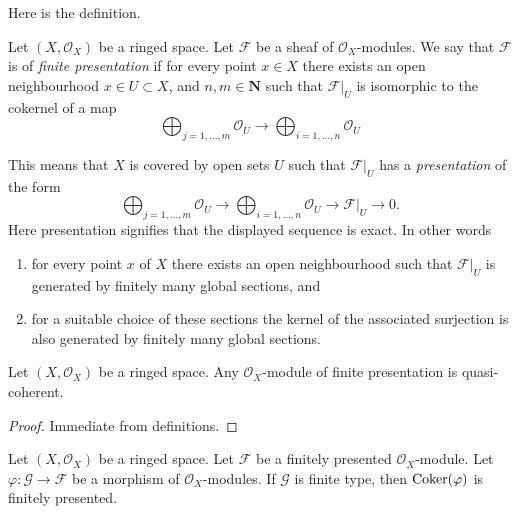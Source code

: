 \noindent
Here is the definition.

\begin{definition}
\label{definition-finite-presentation}
\begin{reference}
\cite[Chapter II, \S 2, no. 38, p. 231]{FAC}
\end{reference}
Let $(X, \mathcal{O}_X)$ be a ringed space.
Let $\mathcal{F}$ be a sheaf of $\mathcal{O}_X$-modules.
We say that $\mathcal{F}$ is of {\it finite presentation}
if for every point $x \in X$ there exists an open neighbourhood
$x\in U \subset X$, and  $n, m \in \mathbf{N}$ such that $\mathcal{F}|_U$
is isomorphic to the cokernel of a map
$$
\bigoplus\nolimits_{j = 1, \ldots, m}
\mathcal{O}_U
\longrightarrow
\bigoplus\nolimits_{i = 1, \ldots, n}
\mathcal{O}_U
$$
\end{definition}

\noindent
This means that $X$ is covered by open sets $U$
such that $\mathcal{F}|_U$ has a {\it presentation}
of the form
$$
\bigoplus\nolimits_{j = 1, \ldots, m}
\mathcal{O}_U
\longrightarrow
\bigoplus\nolimits_{i = 1, \ldots, n}
\mathcal{O}_U
\to
\mathcal{F}|_U
\to
0.
$$
Here presentation signifies that the displayed
sequence is exact. In other words
\begin{enumerate}
\item for every point $x$ of $X$ there exists
an open neighbourhood such that $\mathcal{F}|_U$
is generated by finitely many global sections, and
\item for a suitable choice of these sections
the kernel of the associated surjection is also
generated by finitely many global sections.
\end{enumerate}

\begin{lemma}
\label{lemma-finite-presentation-quasi-coherent}
Let $(X, \mathcal{O}_X)$ be a ringed space.
Any $\mathcal{O}_X$-module of finite presentation
is quasi-coherent.
\end{lemma}

\begin{proof}
Immediate from definitions.
\end{proof}

\begin{lemma}
\label{lemma-cokernel-finite-finite-presentation}
Let $(X,\mathcal{O}_X)$ be a ringed space. Let $\mathcal{F}$ be a
finitely presented $\mathcal{O}_X$-module. Let
$\varphi : \mathcal{G} \to \mathcal{F}$ be a morphism of
$\mathcal{O}_X$-modules. If $\mathcal{G}$ is finite type, then
$\mathop{\mathrm{Coker}}(\varphi)$ is finitely presented.
\end{lemma}

